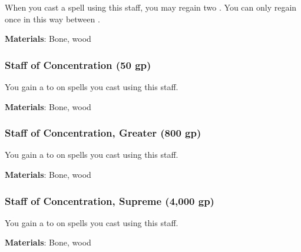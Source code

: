 When you cast a spell using this staff, you may regain two .
You can only regain  once in this way between .



\vspace{0.25em}
\textbf{Materials}: Bone, wood


\lowercase{\hypertarget{item:Staff of Concentration}{}}\label{item:Staff of Concentration}
\hypertarget{item:Staff of Concentration}{\subsubsection{Staff of Concentration\hfill{} (50 gp)}}

You gain a   to  on spells you cast using this staff.



\vspace{0.25em}
\textbf{Materials}: Bone, wood


\lowercase{\hypertarget{item:Staff of Concentration, Greater}{}}\label{item:Staff of Concentration, Greater}
\hypertarget{item:Staff of Concentration, Greater}{\subsubsection{Staff of Concentration, Greater\hfill{} (800 gp)}}

You gain a   to  on spells you cast using this staff.



\vspace{0.25em}
\textbf{Materials}: Bone, wood


\lowercase{\hypertarget{item:Staff of Concentration, Supreme}{}}\label{item:Staff of Concentration, Supreme}
\hypertarget{item:Staff of Concentration, Supreme}{\subsubsection{Staff of Concentration, Supreme\hfill{} (4,000 gp)}}

You gain a   to  on spells you cast using this staff.



\vspace{0.25em}
\textbf{Materials}: Bone, wood


